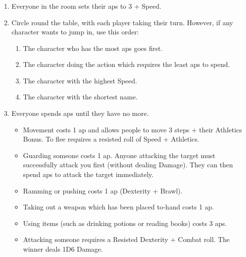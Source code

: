 \subsubsection*{}

\begin{enumerate}
  \item
  Everyone in the room sets their \glspl{ap} to 3 + Speed.
  \item
  Circle round the table, with each player taking their turn.
  However, if any character wants to jump in, use this order:
  \begin{enumerate}
    \item
    The character who has the most \glspl{ap} goes first.
    \item
    The character doing the action which requires the least \glspl{ap} to spend.
    \item
    The character with the highest Speed.
    \item
    The character with the shortest name.
  \end{enumerate}
  \item
  Everyone spends \glspl{ap} until they have no more.
  \begin{itemize}
    \item
    Movement costs 1 \gls{ap} and allows people to move 3 steps + their Athletics Bonus.
    To flee requires a resisted roll of Speed + Athletics.
    \item
    Guarding someone costs 1 \gls{ap}.
    Anyone attacking the target must successfully attack you first (without dealing Damage).
    They can then spend \glspl{ap} to attack the target immediately.
    \item
    Ramming or pushing costs 1 \gls{ap} (Dexterity + Brawl).
    \item
    Taking out a weapon which has been placed to-hand costs 1 \gls{ap}.
    \item
    Using items (such as drinking potions or reading books) costs 3 \glspl{ap}.
    \item
    Attacking someone requires a Resisted Dexterity + Combat roll.
    The winner deals 1D6 Damage.
  \end{itemize}
\end{enumerate}

